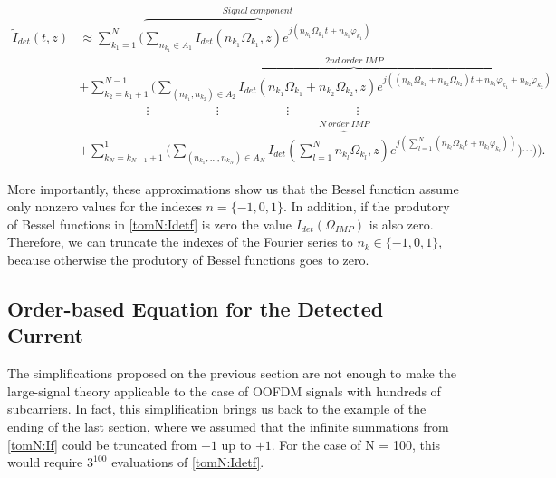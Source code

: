 \documentclass[journal]{IEEEtran}
\begin{document}
\begin{table*}[bp]
\hline
\begin{align} \label{tomN:Is2} \nonumber
\tilde{I}_{det}(t,z) & \approx \sum_{k_1=1}^N\Bigg(\overbrace{\sum_{n_{k_1} \in A_1} I_{det}(n_{k_1}\Omega_{k_1},z)e^{j(n_{k_1}\Omega_{k_1}t + n_{k_1}\varphi_{k_1})}}^{Signal~component} \\ \nonumber
&+ \sum_{k_2=k_1+1}^{N-1}\Bigg(\overbrace{\sum_{(n_{k_1}, n_{k_2}) \in A_2} I_{det}(n_{k_1}\Omega_{k_1}+n_{k_2}\Omega_{k_2},z)e^{j((n_{k_1}\Omega_{k_1}+n_{k_2}\Omega_{k_2})t + n_{k_1}\varphi_{k_1}+n_{k_2}\varphi_{k_2})}}^{2nd~order~IMP} \\ \nonumber
& ~~~~~~~~~~~~~~~~~~~~~~~~\vdots~~~~~~~~~~~~~~~~~~~~~~~~\vdots~~~~~~~~~~~~~~~~~~~~~~~~\vdots~~~~~~~~~~~~~~~~~~~~~~~~\vdots \\
&+ \sum_{k_N=k_{N-1}+1}^{1}\Bigg(\overbrace{\sum_{(n_{k_1}, \ldots, n_{k_N}) \in A_N} I_{det}(\textstyle\sum_{l=1}^N n_{k_l}\Omega_{k_l},z)e^{j(\sum_{l=1}^N (n_{k_l}\Omega_{k_l}t + n_{k_l}\varphi_{k_l}))}}^{N~order~IMP}\Bigg)\cdots\Bigg)\Bigg).
\end{align}
\end{table*}

More importantly, these approximations show us that the Bessel function assume only nonzero values for the indexes $n = \{-1,0,1\}$. In addition, if the produtory of Bessel functions in \eqref{tomN:Idetf} is zero the value $I_{det}(\Omega_{IMP})$ is also zero. Therefore, we can truncate the indexes of the Fourier series to $n_k \in \{-1,0,1\}$, because otherwise the produtory of Bessel functions goes to zero.

\subsection{Order-based Equation for the Detected Current}
The simplifications proposed on the previous section are not enough to make the large-signal theory applicable to the case of OOFDM signals with hundreds of subcarriers. In fact, this simplification brings us back to the example of the ending of the last section, where we assumed that the infinite summations from \eqref{tomN:If} could be truncated from $-1$ up to $+1$. For the case of N = 100, this would require $3^{100}$ evaluations of \eqref{tomN:Idetf}.
\end{document}

